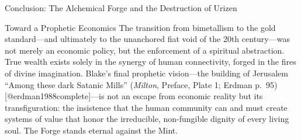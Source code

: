 \documentclass[
  ignorenonframetext,
]{beamer}
\begin{document}
\begin{frame}{Conclusion: The Alchemical Forge and the Destruction of
Urizen}
\begin{block}{Toward a Prophetic Economics}
The transition from bimetallism to the gold standard---and ultimately to
the unanchored fiat void of the 20th century---was not merely an
economic policy, but the enforcement of a spiritual abstraction. True
wealth exists solely in the synergy of human connectivity, forged in the
fires of divine imagination. Blake's final prophetic vision---the
building of Jerusalem ``Among these dark Satanic Mills'' (\emph{Milton},
Preface, Plate 1; Erdman p.~95) {[}@erdman1988complete{]}---is not an
escape from economic reality but its transfiguration: the insistence
that the human community can and must create systems of value that honor
the irreducible, non-fungible dignity of every living soul. The Forge
stands eternal against the Mint.
\end{block}
\end{frame}
\end{document}
